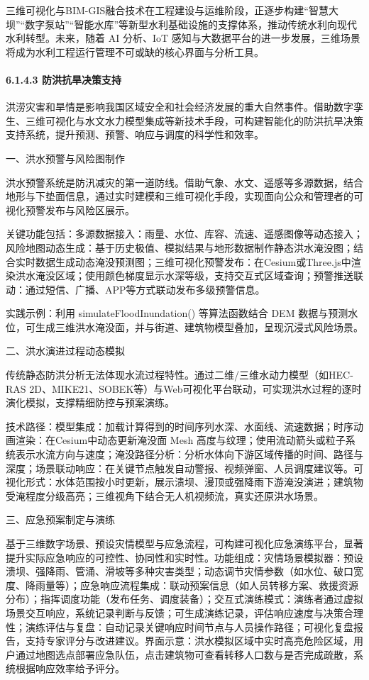 三维可视化与BIM-GIS融合技术在工程建设与运维阶段，正逐步构建``智慧大坝''``数字泵站''``智能水库''等新型水利基础设施的支撑体系，推动传统水利向现代水利转型。未来，随着 AI 分析、IoT 感知与大数据平台的进一步发展，三维场景将成为水利工程运行管理不可或缺的核心界面与分析工具。

\hypertarget{ux9632ux6d2aux6297ux65f1ux51b3ux7b56ux652fux6301}{%
\paragraph{6.1.4.3 防洪抗旱决策支持}\label{ux9632ux6d2aux6297ux65f1ux51b3ux7b56ux652fux6301}}

洪涝灾害和旱情是影响我国区域安全和社会经济发展的重大自然事件。借助数字孪生、三维可视化与水文水力模型集成等新技术手段，可构建智能化的防洪抗旱决策支持系统，提升预测、预警、响应与调度的科学性和效率。

一、洪水预警与风险图制作

洪水预警系统是防汛减灾的第一道防线。借助气象、水文、遥感等多源数据，结合地形与下垫面信息，通过实时建模和三维可视化手段，实现面向公众和管理者的可视化预警发布与风险区展示。

关键功能包括：多源数据接入：雨量、水位、库容、流速、遥感图像等动态接入；风险地图动态生成：基于历史极值、模拟结果与地形数据制作静态洪水淹没图；结合实时数据生成动态淹没预测图；三维可视化预警发布：在Cesium或Three.js中渲染洪水淹没区域；使用颜色梯度显示水深等级，支持交互式区域查询；预警推送联动：通过短信、广播、APP等方式联动发布多级预警信息。

实践示例：利用 simulateFloodInundation() 等算法函数结合 DEM 数据与预测水位，可生成三维洪水淹没面，并与街道、建筑物模型叠加，呈现沉浸式风险场景。

二、洪水演进过程动态模拟

传统静态防洪分析无法体现水流过程特性。通过二维/三维水动力模型（如HEC-RAS 2D、MIKE21、SOBEK等）与Web可视化平台联动，可实现洪水过程的逐时演化模拟，支撑精细防控与预案演练。

技术路径：模型集成：加载计算得到的时间序列水深、水面线、流速数据；时序动画渲染：在Cesium中动态更新淹没面 Mesh 高度与纹理；使用流动箭头或粒子系统表示水流方向与速度；淹没路径分析：分析水体向下游区域传播的时间、路径与深度；场景联动响应：在关键节点触发自动警报、视频弹窗、人员调度建议等。可视化形式：水体范围按小时更新，展示溃坝、漫顶或强降雨下游淹没演进；建筑物受淹程度分级高亮；三维视角下结合无人机视频流，真实还原洪水场景。

三、应急预案制定与演练

基于三维数字场景、预设灾情模型与应急流程，可构建可视化应急演练平台，显著提升实际应急响应的可控性、协同性和实时性。功能组成：灾情场景模拟器：预设溃坝、强降雨、管涌、滑坡等多种灾害类型；动态调节灾情参数（如水位、破口宽度、降雨量等）；应急响应流程集成：联动预案信息（如人员转移方案、救援资源分布）；指挥调度功能（发布任务、调度装备）；交互式演练模式：演练者通过虚拟场景交互响应，系统记录判断与反馈；可生成演练记录，评估响应速度与决策合理性；演练评估与复盘：自动记录关键响应时间节点与人员操作路径；可视化复盘报告，支持专家评分与改进建议。界面示意：洪水模拟区域中实时高亮危险区域，用户通过地图选点部署应急队伍，点击建筑物可查看转移人口数与是否完成疏散，系统根据响应效率给予评分。


